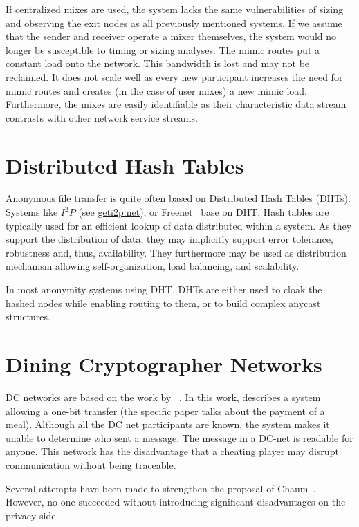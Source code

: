 If centralized mixes are used, the system lacks the same vulnerabilities of sizing and observing the exit nodes as all previously mentioned systems. If we assume that the sender and receiver operate a mixer themselves, the system would no longer be susceptible to timing or sizing analyses. The mimic routes put a constant load onto the network. This bandwidth is lost and may not be reclaimed. It does not scale well as every new participant increases the need for mimic routes and creates (in the case of user mixes) a new mimic load. Furthermore, the mixes are easily identifiable as their characteristic data stream contrasts with other network service streams.

\section{Distributed Hash Tables}
Anonymous file transfer is quite often based on Distributed Hash Tables (DHTs). Systems like $I^2P$ (see \href{https://geti2p.net/}{geti2p.net}), or Freenet~\cite{freenet} base on DHT. Hash tables are typically used for an efficient lookup of data distributed within a system. As they support the distribution of data, they may implicitly support error tolerance, robustness and, thus, availability. They furthermore may be used as distribution mechanism allowing self-organization, load balancing, and scalability.

In most anonymity systems using DHT, DHTs are either used to cloak the hashed nodes while enabling routing to them, or to build complex anycast structures.

\section{Dining Cryptographer Networks}
DC networks are based on the work  by \citeauthor{chaum-dc}~\cite{chaum-dc}. In this work, \citeauthor{chaum-dc} describes a system allowing a one-bit transfer (the specific paper talks about the payment of a meal). Although all the DC net participants are known, the system makes it unable to determine who sent a message. The message in a DC-net is readable for anyone. This network has the disadvantage that a cheating player may disrupt communication without being traceable.

Several attempts have been made to strengthen the proposal of Chaum~\cite{golle:eurocrypt2004,disco,herbivore:tr,Corrigan-Gibbs:2010:DAA:1866307.1866346}. However, no one succeeded without introducing significant disadvantages on the privacy side.

